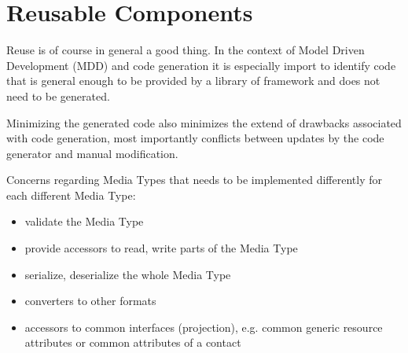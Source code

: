 \documentclass[12pt,a4paper]{scrartcl}		%
\begin{document}
\section{Reusable Components}

Reuse is of course in general a good thing. In the context of Model Driven
Development (MDD) and code generation it is especially import to identify code
that is general enough to be provided by a library of framework and does not
need to be generated.

Minimizing the generated code also minimizes the extend of drawbacks associated
with code generation, most importantly conflicts between updates by the code
generator and manual modification.





Concerns regarding Media Types that needs to be implemented differently for each different Media Type:
\begin{itemize}
\item validate the Media Type
\item provide accessors to read, write parts of the Media Type
\item serialize, deserialize the whole Media Type
\item converters to other formats
\item accessors to common interfaces (projection), e.g. common generic resource attributes or common attributes of a contact
\end{itemize}
\end{document}
